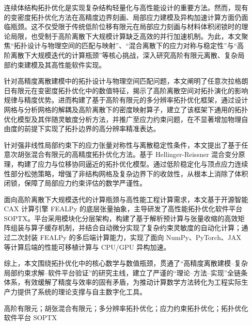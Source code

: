 \begin{cnabstract}
	
	连续体结构拓扑优化是实现复杂结构轻量化与高性能设计的重要方法。然而，现有的变密度拓扑优化方法在高精度边界刻画、局部应力建模及异构加速计算方面仍面临瓶颈。这不仅受限于传统低阶位移有限元在局部应力刻画与材料体积闭锁时的理论局限，也受制于高阶离散下大规模计算缺乏高效的并行加速机制。为此，本文聚焦“拓扑设计与物理空间的匹配与映射”、“混合离散下的应力对称与稳定性”与“高阶离散下大规模迭代的计算瓶颈”等核心挑战，深入研究高阶有限元离散、复杂局部约束建模及其高性能软件实现。
	
	针对高精度离散建模中的拓扑设计与物理空间匹配问题，本文阐明了任意次拉格朗日有限元在变密度拓扑优化中的数值特征，揭示了高阶离散空间对拓扑演化的影响规律与精度优势。进而构建了基于高阶有限元的多分辨率拓扑优化框架，通过设计网格与分析网格的解耦及高阶离散下的密度映射算子，建立了该框架下通用的拓扑优化模型及其伴随灵敏度分析方法，并推广至应力约束问题，在不显著增加物理自由度的前提下实现了拓扑边界的高分辨率精准表达。
	
	针对强非线性局部约束下的应力张量对称性与离散稳定性条件，本文提出了基于任意次胡张混合有限元的高精度拓扑优化方法。基于 Hellinger-Reissner 混合变分原理，构建了应力与位移协同逼近的拓扑优化模型。通过低阶稳定化与顶点应力连续性部分松弛策略，增强了非结构网格及复杂边界下的收敛性，从根本上消除了体积闭锁，保障了局部应力约束评估的数学严谨性。
	
	面向高阶离散下大规模迭代的计算瓶颈与高性能工程计算需求，本文基于开源智能 CAX 计算引擎 FEALPy 的底层张量抽象，主导研发了高性能拓扑优化软件平台 SOPTX。平台采用模块化分层架构，构建了基于解析预计算与张量收缩的高效矩阵组装与算子缓存机制，并结合自动微分实现了复杂约束灵敏度的自动化计算；通过二次封装 FEALPy 的多后端计算能力，实现了面向 NumPy、PyTorch、JAX 等计算后端的性能可移植计算与 CPU/GPU 异构加速。
	
	综上，本文围绕拓扑优化中的核心数学与数值瓶颈，贯通了“高精度离散建模{--}复杂局部约束求解{--}软件平台验证”的研究主线，建立了严谨的“理论{--}方法{--}实现”全链条体系，有效缓解了精度与效率的固有矛盾，为推动计算数学方法转化为工程实际生产力提供了系统的理论支撑与自主数字化工具。

\end{cnabstract}

\begin{cnkeywords}
	高阶有限元；胡张混合有限元；多分辨率拓扑优化；应力约束拓扑优化；拓扑优化软件平台 SOPTX
\end{cnkeywords}

